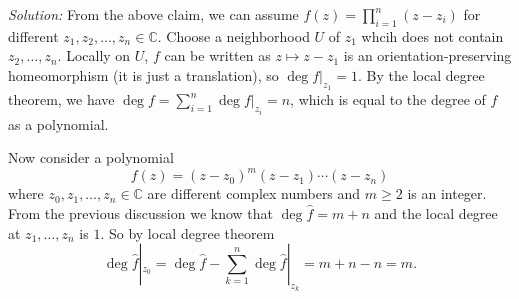 \documentclass[a4paper, 12pt]{article}
\newenvironment{solution}
    {\textit{Solution:}}
    {}
\begin{document}
\begin{solution}
From the above claim, we can assume \(f(z)=\prod_{i=1}^n(z-z_i)\) for different \(z_1,z_2,\ldots,z_n\in \mathbb{C}\). Choose a neighborhood \(U\) of \(z_1\) whcih does not contain \(z_2,\ldots,z_n\). Locally on \(U\), \(f\) can be 
written as \(z\mapsto z-z_1\) is an orientation-preserving homeomorphism (it is just a translation), so \(\deg f|_{z_1}=1\). By the local degree theorem, we have \(\deg f=\sum_{i=1}^n \deg f|_{z_i}=n\), which is equal to the degree of \(f\) as a polynomial.

Now consider a polynomial 
\[f(z)=(z-z_0)^m(z-z_1)\cdots(z-z_n)\] 
where \(z_0,z_1,\ldots,z_n\in \mathbb{C}\) are different complex numbers and \(m\geq 2\) is an integer. From the previous discussion we know that \(\deg \hat{f}=m+n\) and the local degree at \(z_1,\ldots,z_n\) is \(1\). So by local degree theorem 
\[\deg \hat{f}|_{z_0}=\deg \hat{f}-\sum_{k=1}^{n} \deg \hat{f}|_{z_k}=m+n-n=m.\]
\end{solution}
\end{document}
